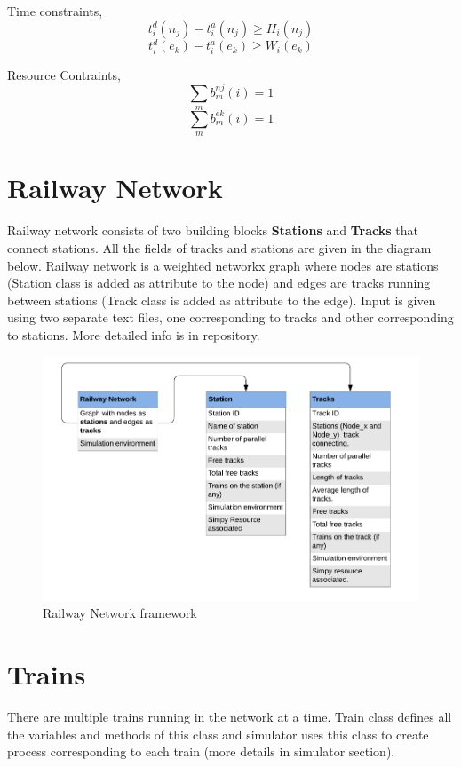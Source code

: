 \vspace{0.25cm}
Time constraints, $$t^{d}_{i} (n_{j} ) - t^{a}_{i} (n_{j} ) \geq H_{i} (n_{j} )$$
$$t^{d}_{i} (e_{k} ) - t^{a}_{i} (e_{k} ) \geq W_{i} (e_{k} )$$

Resource Contraints,
$$\sum_{m} b_{m}^{nj}(i) = 1$$
$$\sum_{m} b_{m}^{ek}(i) = 1$$

\section{Railway Network}


Railway network consists of two building blocks \textbf{Stations} and \textbf{Tracks} that connect
stations. All the fields of tracks and stations are given in the diagram below. Railway network is a weighted 
networkx graph where nodes are stations (Station class is added as attribute to the node) and edges are 
tracks running between stations (Track class is added as attribute to the edge). Input is given using two
separate text files, one corresponding to tracks and other corresponding to stations. More detailed info is 
in repository.


\begin{figure}[h]
    \centering
    \includegraphics[width=1.0\textwidth]{Rail_train}
    \caption{ Railway Network framework }
    \label{image-myimage2}
\end{figure}

\section{Trains}
There are multiple trains running in the network at a time. Train class defines all the variables and methods
of this class and simulator uses this class to create process corresponding to each train (more details in simulator 
section).

